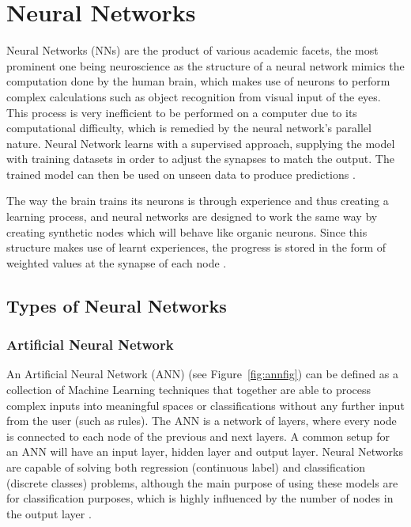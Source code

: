     \chapter[Neural Networks]{Neural Networks}
\label{ch:neural-networks}
Neural Networks (NNs) are the product of various academic facets, the most prominent one being neuroscience as the structure of a neural network mimics the computation done by the human brain, which makes use of neurons to perform complex calculations such as object recognition from visual input of the eyes. This process is very inefficient to be performed on a computer due to its computational difficulty, which is remedied by the neural network's parallel nature. Neural Network learns with a supervised approach, supplying the model with training datasets in order to adjust the synapses to match the output. The trained model can then be used on unseen data to produce predictions \citep{GURESEN2011426}.

The way the brain trains its neurons is through experience and thus creating a learning process, and neural networks are designed to work the same way by creating synthetic nodes which will behave like organic neurons. Since this structure makes use of learnt experiences, the progress is stored in the form of weighted values at the synapse of each node \citep{Haykin:1994:NNC:541500}.

\section{Types of Neural Networks}

\subsection{Artificial Neural Network}\label{sec:Artificial Neural Network}
An Artificial Neural Network (ANN) (see Figure~\ref{fig:annfig}) can be defined as a collection of Machine Learning techniques that together are able to process complex inputs into meaningful spaces or classifications without any further input from the user (such as rules). The ANN is a network of layers, where every node is connected to each node of the previous and next layers. A common setup for an ANN will have an input layer, hidden layer and output layer. Neural Networks are capable of solving both regression (continuous label) and classification (discrete classes) problems, although the main purpose of using these models are for classification purposes, which is highly influenced by the number of nodes in the output layer \citep{Devulapalli2015}.

